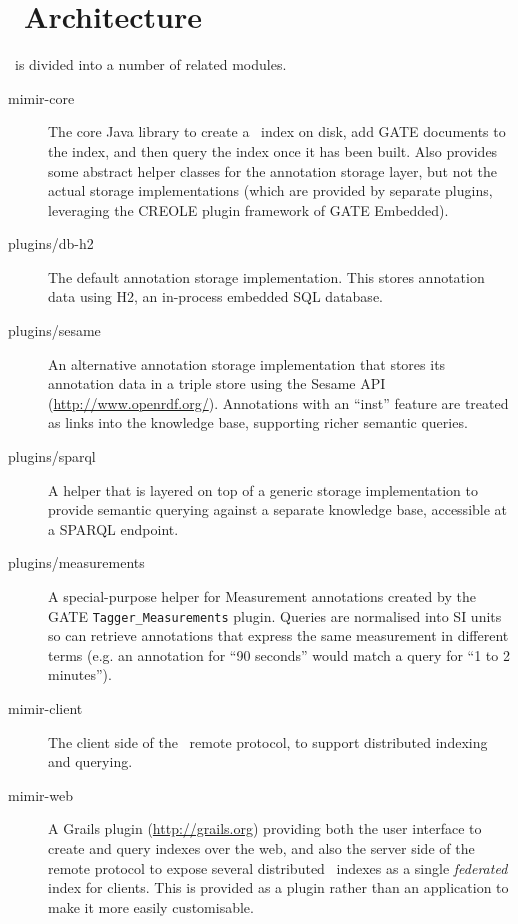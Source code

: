 \section{\Mimir\ Architecture}

\Mimir\ is divided into a number of related modules.

\begin{description}
\item[mimir-core] The core Java library to create a \Mimir\ index on disk, add
GATE documents to the index, and then query the index once it has been built.
Also provides some abstract helper classes for the annotation storage layer,
but not the actual storage implementations (which are provided by separate
plugins, leveraging the CREOLE plugin framework of GATE Embedded).

\item[plugins/db-h2] The default annotation storage implementation.  This
stores annotation data using H2, an in-process embedded SQL database.

\item[plugins/sesame] An alternative annotation storage implementation that
stores its annotation data in a triple store using the Sesame API
(\url{http://www.openrdf.org/}).  Annotations with an ``inst'' feature are
treated as links into the knowledge base, supporting richer semantic queries.

\item[plugins/sparql] A helper that is layered on top of a generic storage
implementation to provide semantic querying against a separate knowledge base,
accessible at a SPARQL endpoint.

\item[plugins/measurements] A special-purpose helper for Measurement
annotations created by the GATE {\tt Tagger\_Measurements} plugin.  Queries are
normalised into SI units so can retrieve annotations that express the same
measurement in different terms (e.g. an annotation for ``90 seconds'' would
match a query for ``1 to 2 minutes'').

\item[mimir-client] The client side of the \Mimir\ remote protocol, to support
distributed indexing and querying.

\item[mimir-web] A Grails plugin (\url{http://grails.org}) providing
both the user interface to create and query indexes over the web, and also the
server side of the remote protocol to expose several distributed \Mimir\
indexes as a single {\em federated} index for clients.  This is provided as a
plugin rather than an application to make it more easily customisable.


\end{description}
